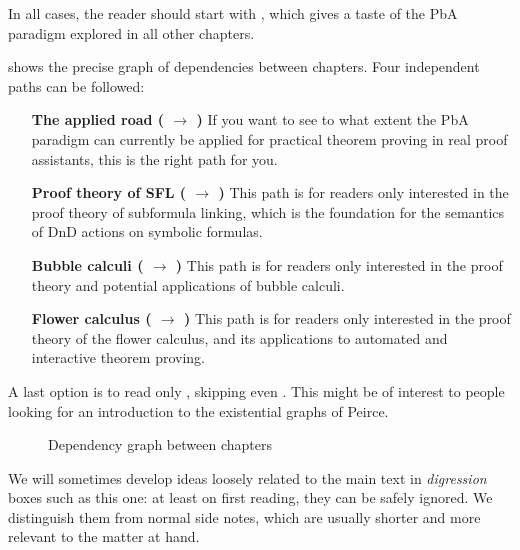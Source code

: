 \begin{emphpar}
  In all cases, the reader should start with , which gives a taste of
  the PbA paradigm explored in all other chapters.
\end{emphpar}

 shows the precise graph of dependencies between chapters.
Four independent paths can be followed:
\begin{itemize}
  \item[\textbf{The applied road (\ding{175} $\to$ \ding{177})}] If
  you want to see to what extent the PbA paradigm can currently be applied for
  practical theorem proving in real proof assistants, this is the right path for
  you.

  \item[\textbf{Proof theory of SFL (\ding{174} $\to$ \ding{176})}]
  This path is for readers only interested in the proof theory of subformula
  linking, which is the foundation for the semantics of DnD actions on symbolic
  formulas.

  \item[\textbf{Bubble calculi (\ding{178} $\to$ \ding{179})}]
  This path is for readers only interested in the proof theory and potential
  applications of bubble calculi.
  
  \item[\textbf{Flower calculus (\ding{180} $\to$ \ding{181})}] This path is for
  readers only interested in the proof theory of the flower calculus, and its
  applications to automated and interactive theorem proving.
\end{itemize}

A last option is to read only , skipping even . This might
be of interest to people looking for an introduction to the existential graphs
of Peirce.

\begin{figure*}
  \caption{Dependency graph between chapters}
\end{figure*}

\begin{digression}
  We will sometimes develop ideas loosely related to the main text in
  \emph{digression} boxes such as this one: at least on first reading, they can
  be safely ignored. We distinguish them from normal side notes, which are
  usually shorter and more relevant to the matter at hand.
\end{digression}

